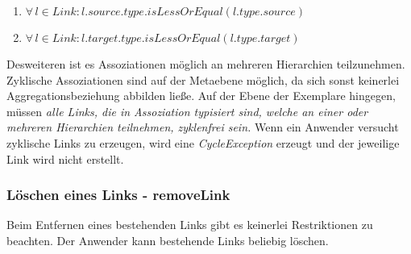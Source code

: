 \begin{enumerate}
\item $\forall \, l \in Link: l.source.type.isLessOrEqual(l.type.source)$
\item $\forall \, l \in Link: l.target.type.isLessOrEqual(l.type.target)$
\end{enumerate}

Desweiteren ist es Assoziationen möglich an mehreren Hierarchien teilzunehmen. Zyklische Assoziationen sind auf der Metaebene möglich, 
da sich sonst keinerlei Aggregationsbeziehung abbilden ließe.
Auf der Ebene der Exemplare hingegen, müssen \emph{alle Links, die in Assoziation typisiert sind, welche an einer oder mehreren Hierarchien teilnehmen, zyklenfrei sein.}
Wenn ein Anwender versucht zyklische Links zu erzeugen, wird eine \emph{CycleException} erzeugt und der jeweilige Link wird nicht erstellt.

\subsubsection{Löschen eines Links - removeLink}
Beim Entfernen eines bestehenden Links gibt es keinerlei Restriktionen zu beachten. Der Anwender kann bestehende Links beliebig löschen.